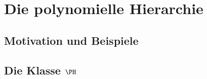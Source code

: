 \section{Die polynomielle Hierarchie}
\subsection{Motivation und Beispiele}

\subsection{Die Klasse $\PH$}

